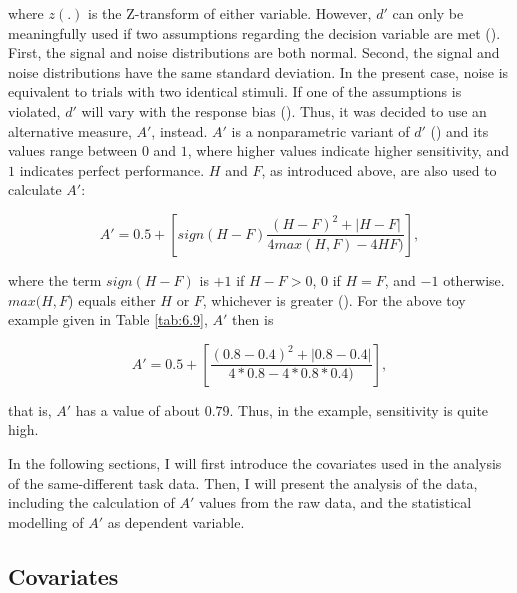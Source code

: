 \noindent where $z(.)$ is the Z-transform of either variable. However, $d'$ can only be meaningfully used if two assumptions regarding the decision variable are met (\cite{Stanislaw1999}). First, the signal and noise distributions are both normal. Second, the signal and noise distributions have the same standard deviation. In the present case, noise is equivalent to trials with two identical stimuli. If one of the assumptions is violated, $d'$ will vary with the response bias (\cite{Stanislaw1999}). Thus, it was decided to use an alternative measure, $A'$, instead. $A'$ is a nonparametric variant of $d'$ (\cite{Pollack1964}) and its values range between $0$ and $1$, where higher values indicate higher sensitivity, and $1$ indicates perfect performance. $H$ and $F$, as introduced above, are also used to calculate $A'$:

\begin{equation}
\label{eq:aprime}
    A'=0.5+\left [ sign(H-F)\frac{(H-F)^2+|H-F|}{4max(H,F)-4HF)}\right ],
\end{equation}

\noindent where the term $sign(H-F)$ is $+1$ if $H-F>0$, $0$ if $H=F$, and $-1$ otherwise. $max⁡(H,F$) equals either $H$ or $F$, whichever is greater (\cite{Stanislaw1999}). For the above toy example given in Table \ref{tab:6.9}, $A'$ then is

\begin{equation}
\label{eq:aprimeex}
    A'=0.5+\left [ \frac{(0.8-0.4)^2+|0.8-0.4|}{4*0.8-4*0.8*0.4)}\right ],
\end{equation}

\noindent that is, $A'$ has a value of about $0.79$. Thus, in the example, sensitivity is quite high.

In the following sections, I will first introduce the covariates used in the analysis of the same-different task data. Then, I will present the analysis of the data, including the calculation of $A'$ values from the raw data, and the statistical modelling of $A'$ as dependent variable.

\subsection{Covariates}\label{section06_2_1}

